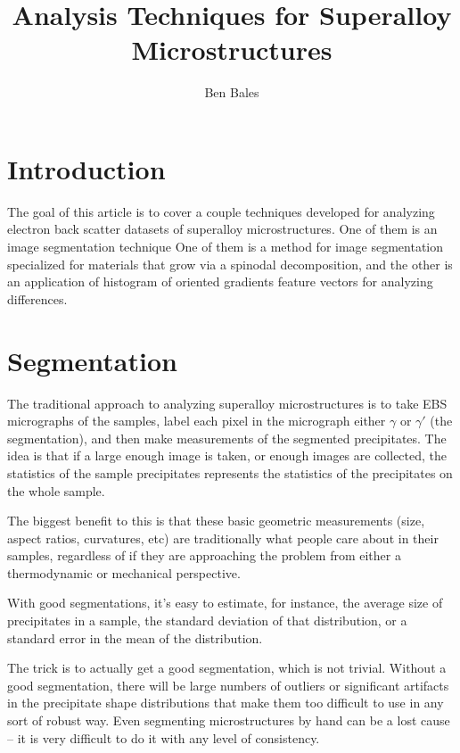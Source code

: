 \documentclass[11pt]{article}
\title{\textbf{Analysis Techniques for Superalloy Microstructures}}
\author{Ben Bales}
\date{}
\begin{document}
\maketitle

\section{Introduction}
The goal of this article is to cover a couple techniques developed for analyzing electron back scatter datasets of superalloy microstructures. One of them is an image segmentation technique  One of them is a method for image segmentation specialized for materials that grow via a spinodal decomposition, and the other is an application of histogram of oriented gradients feature vectors for analyzing differences.

\section{Segmentation}
The traditional approach to analyzing superalloy microstructures is to take EBS micrographs of the samples, label each pixel in the micrograph either $\gamma$ or $\gamma'$ (the segmentation), and then make measurements of the segmented precipitates. The idea is that if a large enough image is taken, or enough images are collected, the statistics of the sample precipitates represents the statistics of the precipitates on the whole sample.

The biggest benefit to this is that these basic geometric measurements (size, aspect ratios, curvatures, etc) are traditionally what people care about in their samples, regardless of if they are approaching the problem from either a thermodynamic or mechanical perspective.

With good segmentations, it's easy to estimate, for instance, the average size of precipitates in a sample, the standard deviation of that distribution, or a standard error in the mean of the distribution.

The trick is to actually get a good segmentation, which is not trivial. Without a good segmentation, there will be large numbers of outliers or significant artifacts in the precipitate shape distributions that make them too difficult to use in any sort of robust way. Even segmenting microstructures by hand can be a lost cause -- it is very difficult to do it with any level of consistency.
\end{document}
